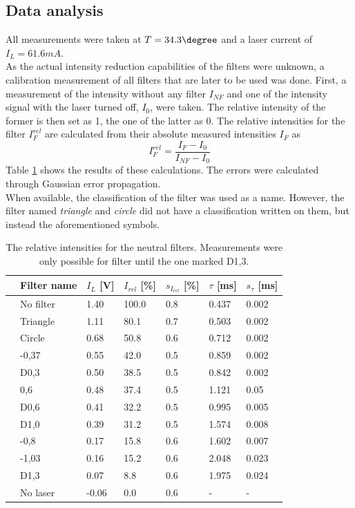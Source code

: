 \subsection{Data analysis}
All measurements were taken at $T=\unit{34.3}{\degree}$ and a laser current of $I_L=\unit{61.6}{mA}$.\\
As the actual intensity reduction capabilities of the filters were unknown, a calibration measurement of all filters that are later to be used was done. First, a measurement of the intensity without any filter $I_{NF}$ and one of the intensity signal with the laser turned off, $I_0$, were taken. The relative intensity of the former is then set as 1, the one of the latter as 0. The relative intensities for the filter $I^{rel}_F$ are calculated from their absolute measured intensities $I_F$ as
\begin{equation}
I^{rel}_F=\frac{I_F-I_0}{I_{NF}-I_0}
\end{equation}
Table \ref{tb:relintensities} shows the results of these calculations. The errors were calculated through Gaussian error propagation.\\ 
When available, the classification of the filter was used as a name. However, the filter named \emph{triangle} and \emph{circle} did not have a classification written on them, but instead the aforementioned symbols. 

\begin{table}\centering
	\begin{tabular}{@{}lllllll@{}}
		\toprule
		&Filter name&$I_L$ [V]&$I_{rel}$ [\%]&$s_{I_{rel}}$ [\%]&$\tau$ [ms]&$s_\tau$ [ms]\\ 
		\midrule
		&No filter&1.40&100.0&0.8&0.437&0.002\\
		&Triangle&1.11&80.1&0.7&0.503&0.002\\
		&Circle&0.68&50.8&0.6&0.712&0.002\\
		&-0,37&0.55&42.0&0.5&0.859&0.002\\
		&D0,3&0.50&38.5&0.5&0.842&0.002\\
		&0,6&0.48&37.4&0.5&1.121&0.05\\
		&D0,6&0.41&32.2&0.5&0.995&0.005\\
		&D1,0&0.39&31.2&0.5&1.574&0.008\\
		&-0,8&0.17&15.8&0.6&1.602&0.007\\
		&-1,03&0.16&15.2&0.6&2.048&0.023\\
		&D1,3&0.07&8.8&0.6&1.975&0.024\\
		&No laser&-0.06&0.0&0.6&-&-\\
		\bottomrule
	\end{tabular}
	\caption[Relative intensities of the filters]{The relative intensities for the neutral filters. Measurements were only possible for filter until the one marked D1,3.}
	\label{tb:relintensities}
\end{table}

